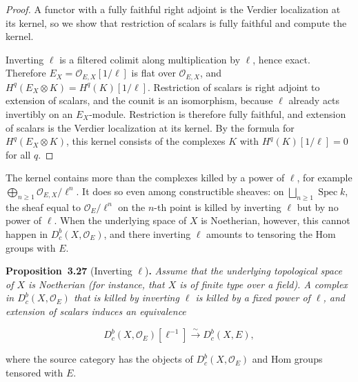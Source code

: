 \documentclass[11pt]{article}
\newenvironment{bpstatement}[2]{\par\addvspace{0.6\baselineskip}\noindent\textbf{#1}#2\textbf{.}\enspace\ignorespaces}
  {\par\addvspace{0.4\baselineskip}}
\newenvironment{bpstatementit}[2]{\begin{bpstatement}{#1}{#2}\itshape\ignorespaces}{\end{bpstatement}}
\providecommand{\Dbc}{}\renewcommand{\Dbc}{D^b_c}
\begin{document}
\begin{proof}[{Proof}]\label{bp281}%
A functor with a fully faithful right adjoint is the Verdier localization at its kernel, so we show that restriction of scalars is fully faithful and compute the kernel.

Inverting \(\ell\) is a filtered colimit along multiplication by \(\ell\), hence exact. Therefore \(E_X=\mathcal O_{E,X}[1/\ell]\) is flat over \(\mathcal O_{E,X}\), and \(H^q(E_X\otimes K)=H^q(K)[1/\ell]\). Restriction of scalars is right adjoint to extension of scalars, and the counit is an isomorphism, because \(\ell\) already acts invertibly on an \(E_X\)-module. Restriction is therefore fully faithful, and extension of scalars is the Verdier localization at its kernel. By the formula for \(H^q(E_X\otimes K)\), this kernel consists of the complexes \(K\) with \(H^q(K)[1/\ell]=0\) for all \(q\).
\end{proof}

\label{bp282}%
The kernel contains more than the complexes killed by a power of \(\ell\), for example \(\bigoplus_{n\ge1}\mathcal O_{E,X}/\ell^n\). It does so even among constructible sheaves: on \(\bigsqcup_{n\ge1}\operatorname{Spec}k\), the sheaf equal to \(\mathcal O_E/\ell^n\) on the \(n\)-th point is killed by inverting \(\ell\) but by no power of \(\ell\). When the underlying space of \(X\) is Noetherian, however, this cannot happen in \(\Dbc(X,\mathcal O_E)\), and there inverting \(\ell\) amounts to tensoring the Hom groups with \(E\).

\label{bp283}%
\begin{bpstatementit}{Proposition~3.27}{ (Inverting $\ell$)}
Assume that the underlying topological space of \(X\) is Noetherian (for instance, that \(X\) is of finite type over a field). A complex in \(\Dbc(X,\mathcal O_E)\) that is killed by inverting \(\ell\) is killed by a fixed power of \(\ell\), and extension of scalars induces an equivalence

\[
\Dbc(X,\mathcal O_E)[\ell^{-1}]\xrightarrow{\ \sim\ }\Dbc(X,E),
\]

where the source category has the objects of \(\Dbc(X,\mathcal O_E)\) and Hom groups tensored with \(E\).
\end{bpstatementit}
\end{document}
